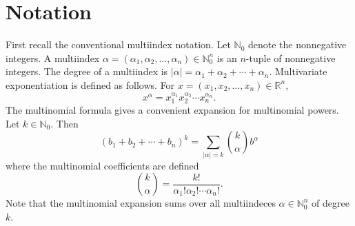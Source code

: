 \documentclass{amsart}
\theoremstyle{remark}
\numberwithin{equation}{section}
\newcommand{\RR}{\mathbb{R}}
\newcommand{\NN}{\mathbb{N}}
\begin{document}


\newpage
\section{Notation}
First recall the conventional multiindex notation. Let $\NN_0$ denote the nonnegative integers. A multiindex $\alpha = (\alpha_1, \alpha_2, \ldots, \alpha_n) \in \NN_0^n$ is an $n$-tuple of nonnegative integers. The degree of a multiindex is $|\alpha| = \alpha_1 + \alpha_2 + \cdots + \alpha_n$. Multivariate exponentiation is defined as follows. For $x = (x_1, x_2, \ldots, x_n) \in \RR^n$,
\[
    x^\alpha = x_1^{\alpha_1}x_2^{\alpha_2} \cdots x_n^{\alpha_n}.
\]
The multinomial formula gives a convenient expansion for multinomial powers. Let $k \in \NN_0$. Then
\[
    {(b_1 + b_2 + \cdots + b_n)}^k = \sum_{|\alpha| = k} \binom{k}{\alpha} b^\alpha
\] 
where the multinomial coefficients are defined
\[
    \binom{k}{\alpha} = \frac{k!}{\alpha_1! \alpha_2! \cdots \alpha_n!}.
\]
Note that the multinomial expansion sums over all multiindeces $\alpha \in \NN_0^n$ of degree $k$.
\end{document}
